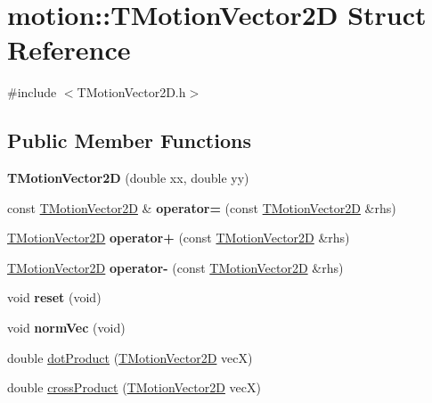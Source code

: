 \hypertarget{structmotion_1_1TMotionVector2D}{}\section{motion\+:\+:T\+Motion\+Vector2D Struct Reference}
\label{structmotion_1_1TMotionVector2D}


{\ttfamily \#include $<$T\+Motion\+Vector2\+D.\+h$>$}

\subsection*{Public Member Functions}
\begin{DoxyCompactItemize}
\item 
\mbox{\label{structmotion_1_1TMotionVector2D_a1ffd55ebfaa46e7d200e5d3411be615d}} 
{\bfseries T\+Motion\+Vector2D} (double xx, double yy)
\item 
\mbox{\label{structmotion_1_1TMotionVector2D_ad3d208eeb33e61a4e647bbfe64c336b5}} 
const \mbox{\hyperlink{structmotion_1_1TMotionVector2D}{T\+Motion\+Vector2D}} \& {\bfseries operator=} (const \mbox{\hyperlink{structmotion_1_1TMotionVector2D}{T\+Motion\+Vector2D}} \&rhs)
\item 
\mbox{\label{structmotion_1_1TMotionVector2D_aa819132aada11b951c9671025da42d0e}} 
\mbox{\hyperlink{structmotion_1_1TMotionVector2D}{T\+Motion\+Vector2D}} {\bfseries operator+} (const \mbox{\hyperlink{structmotion_1_1TMotionVector2D}{T\+Motion\+Vector2D}} \&rhs)
\item 
\mbox{\label{structmotion_1_1TMotionVector2D_a0e6bf24e26c67dee74b716e2e6b99dcd}} 
\mbox{\hyperlink{structmotion_1_1TMotionVector2D}{T\+Motion\+Vector2D}} {\bfseries operator-\/} (const \mbox{\hyperlink{structmotion_1_1TMotionVector2D}{T\+Motion\+Vector2D}} \&rhs)
\item 
\mbox{\label{structmotion_1_1TMotionVector2D_acb0fef67ede09f7ce41e53baefc9f024}} 
void {\bfseries reset} (void)
\item 
\mbox{\label{structmotion_1_1TMotionVector2D_ad9cabba4167876711f68a513d2239526}} 
void {\bfseries norm\+Vec} (void)
\item 
double \mbox{\hyperlink{structmotion_1_1TMotionVector2D_a132bcb4fea81db58a825d28bb1ed5320}{dot\+Product}} (\mbox{\hyperlink{structmotion_1_1TMotionVector2D}{T\+Motion\+Vector2D}} vecX)
\item 
double \mbox{\hyperlink{structmotion_1_1TMotionVector2D_adba9d2291b5dfe245c9b1009bb4c0e64}{cross\+Product}} (\mbox{\hyperlink{structmotion_1_1TMotionVector2D}{T\+Motion\+Vector2D}} vecX)
\end{DoxyCompactItemize}
